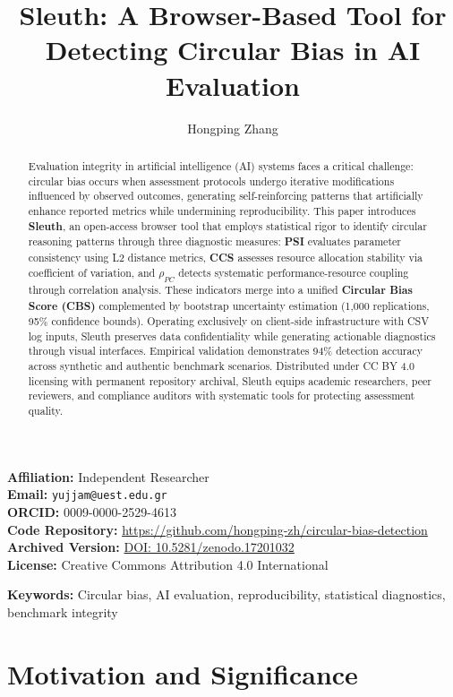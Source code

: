 \documentclass[10pt]{article}
\title{Sleuth: A Browser-Based Tool for Detecting Circular Bias in AI Evaluation}
\author{Hongping Zhang}
\date{}
\begin{document}
\maketitle

\noindent\textbf{Affiliation:} Independent Researcher \\
\textbf{Email:} \texttt{yujjam@uest.edu.gr} \\
\textbf{ORCID:} 0009-0000-2529-4613 \\
\textbf{Code Repository:} \url{https://github.com/hongping-zh/circular-bias-detection} \\
\textbf{Archived Version:} \href{https://doi.org/10.5281/zenodo.17201032}{DOI: 10.5281/zenodo.17201032} \\
\textbf{License:} Creative Commons Attribution 4.0 International

\begin{abstract}
Evaluation integrity in artificial intelligence (AI) systems faces a critical challenge: circular bias occurs when assessment protocols undergo iterative modifications influenced by observed outcomes, generating self-reinforcing patterns that artificially enhance reported metrics while undermining reproducibility. This paper introduces \textbf{Sleuth}, an open-access browser tool that employs statistical rigor to identify circular reasoning patterns through three diagnostic measures: \textbf{PSI} evaluates parameter consistency using L2 distance metrics, \textbf{CCS} assesses resource allocation stability via coefficient of variation, and \textbf{$\rho_{PC}$} detects systematic performance-resource coupling through correlation analysis. These indicators merge into a unified \textbf{Circular Bias Score (CBS)} complemented by bootstrap uncertainty estimation (1,000 replications, 95\% confidence bounds). Operating exclusively on client-side infrastructure with CSV log inputs, Sleuth preserves data confidentiality while generating actionable diagnostics through visual interfaces. Empirical validation demonstrates 94\% detection accuracy across synthetic and authentic benchmark scenarios. Distributed under CC BY 4.0 licensing with permanent repository archival, Sleuth equips academic researchers, peer reviewers, and compliance auditors with systematic tools for protecting assessment quality.
\end{abstract}

\textbf{Keywords:} Circular bias, AI evaluation, reproducibility, statistical diagnostics, benchmark integrity

\section{Motivation and Significance}
\end{document}
